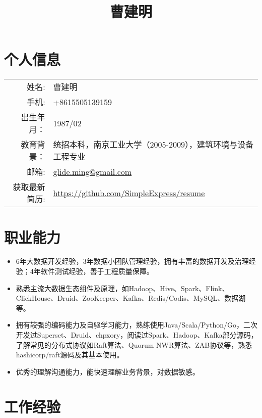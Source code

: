 \documentclass{ctexart}
\author{}
\title{\vspace{-1cm}曹建明}
\date{}
\begin{document}


\section*{个人信息}

\noindent\begin{tabular}{rl}
姓名: & 曹建明\\
手机: & +8615505139159\\
出生年月：& 1987/02\\
教育背景：& 统招本科，南京工业大学（2005-2009），建筑环境与设备工程专业\\
邮箱: & \href{mailto:glide.ming@gmail.com}{glide.ming@gmail.com}\\
获取最新简历: & \href{https://github.com/SimpleExpress/resume/blob/master/CJM_CN.tex}{https://github.com/SimpleExpress/resume}
\end{tabular}

\section*{职业能力}

\begin{itemize}
\item 6年大数据开发经验，3年数据小团队管理经验，拥有丰富的数据开发及治理经验；4年软件测试经验，善于工程质量保障。
\item 熟悉主流大数据生态组件及原理，如Hadoop、Hive、Spark、Flink、ClickHouse、Druid、ZooKeeper、Kafka、Redis/Codis、MySQL、数据湖	等。
\item 拥有较强的编码能力及自驱学习能力，熟练使用Java/Scala/Python/Go，二次开发过Superset、Druid、chpxory，阅读过Spark、Hadoop、Kafka部分源码，了解常见的分布式协议如Raft算法、Quorum NWR算法、ZAB协议等，熟悉hashicorp/raft源码及其基本使用。
\item 优秀的理解沟通能力，能快速理解业务背景，对数据敏感。
\end{itemize}

\section*{工作经验}
\end{document}
